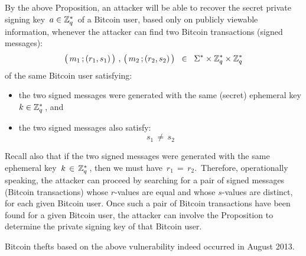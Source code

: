 \begin{remark}
\mbox{}
\vskip 0.1cm
\noindent
By the above Proposition, an attacker will be able to recover the secret
private signing key \,$a \in \mathbb{Z}_{q}^{*}$\, of a Bitcoin user, based only on
publicly viewable information, whenever the attacker can find two
Bitcoin transactions (signed messages):
\begin{equation*}
\left(\,m_{1}\,\overset{{\color{white}.}}{;}\,(r_{1},s_{1})\,\right)
\,,\,
\left(\,m_{2}\,\overset{{\color{white}.}}{;}\,(r_{2},s_{2})\,\right)
\;\; \in \;\;
	\Sigma^{*} \times \Z_{q}^{*} \times \Z_{q}^{*}
\end{equation*}
of the same Bitcoin user satisfying:
\begin{itemize}
\item
	the two signed messages were generated
	with the same (secret) ephemeral key $k \in \mathbb{Z}_{q}^{*}$\,,
	and
\item
	the two signed messages also satisfy:
	\begin{equation*}
	s_{1} \,\neq\, s_{2}
	\end{equation*}
\end{itemize}
Recall also that if the two signed messages were generated with the
same ephemeral key \,$k \,\in\, \mathbb{Z}_{q}^{*}$\,, then we must have
\,$r_{1} \,=\, r_{2}$.\,
Therefore, operationally speaking, the attacker can proceed by
searching for a pair of signed messages (Bitcoin transactions)
whose $r$-values are equal and whose $s$-values are distinct,
for each given Bitcoin user.
Once such a pair of Bitcoin transactions have been found
for a given Bitcoin user, the attacker can involve the
Proposition to determine the private signing key of that Bitcoin user.
\end{remark}

\begin{remark}
\mbox{}
\vskip 0.1cm
\noindent
Bitcoin thefts based on the above vulnerability indeed occurred in August 2013.
\end{remark}

